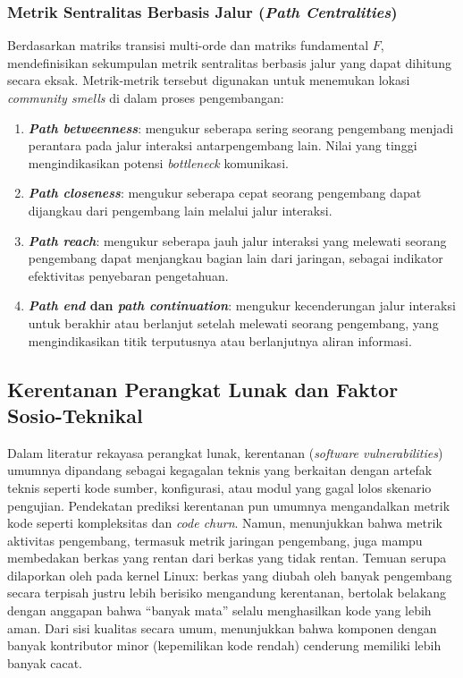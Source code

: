 \subsubsection{Metrik Sentralitas Berbasis Jalur (\textit{Path Centralities})}
Berdasarkan matriks transisi multi-orde dan matriks fundamental $F$, \textcite{gote2023locating} mendefinisikan sekumpulan metrik sentralitas berbasis jalur yang dapat dihitung secara eksak.
Metrik-metrik tersebut digunakan untuk menemukan lokasi \textit{community smells} di dalam proses pengembangan:
\begin{enumerate}[leftmargin=2.8em]
    \item \textbf{\textit{Path betweenness}}: mengukur seberapa sering seorang pengembang menjadi perantara pada jalur interaksi antarpengembang lain. Nilai yang tinggi mengindikasikan potensi \textit{bottleneck} komunikasi.
    \item \textbf{\textit{Path closeness}}: mengukur seberapa cepat seorang pengembang dapat dijangkau dari pengembang lain melalui jalur interaksi.
    \item \textbf{\textit{Path reach}}: mengukur seberapa jauh jalur interaksi yang melewati seorang pengembang dapat menjangkau bagian lain dari jaringan, sebagai indikator efektivitas penyebaran pengetahuan.
    \item \textbf{\textit{Path end} dan \textit{path continuation}}: mengukur kecenderungan jalur interaksi untuk berakhir atau berlanjut setelah melewati seorang pengembang, yang mengindikasikan titik terputusnya atau berlanjutnya aliran informasi.
\end{enumerate}

% 

\subsection{Kerentanan Perangkat Lunak dan Faktor Sosio-Teknikal}
Dalam literatur rekayasa perangkat lunak, kerentanan (\textit{software vulnerabilities}) umumnya dipandang sebagai kegagalan teknis yang berkaitan dengan artefak teknis seperti kode sumber, konfigurasi, atau modul yang gagal lolos skenario pengujian.
Pendekatan prediksi kerentanan pun umumnya mengandalkan metrik kode seperti kompleksitas dan \textit{code churn}.
Namun, \textcite{shin2011evaluating} menunjukkan bahwa metrik aktivitas pengembang, termasuk metrik jaringan pengembang, juga mampu membedakan berkas yang rentan dari berkas yang tidak rentan.
Temuan serupa dilaporkan oleh \textcite{meneely2009secure} pada kernel Linux: berkas yang diubah oleh banyak pengembang secara terpisah justru lebih berisiko mengandung kerentanan, bertolak belakang dengan anggapan bahwa ``banyak mata'' selalu menghasilkan kode yang lebih aman.
Dari sisi kualitas secara umum, \textcite{bird2011ownership} menunjukkan bahwa komponen dengan banyak kontributor minor (kepemilikan kode rendah) cenderung memiliki lebih banyak cacat.

